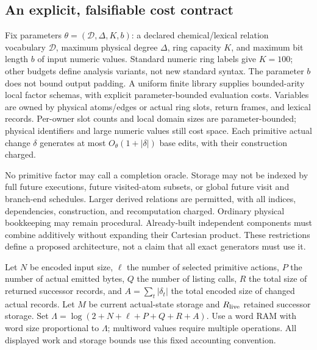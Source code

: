 \documentclass[11pt,a4paper]{article}
\begin{document}
\subsection{An explicit, falsifiable cost contract}
Fix parameters \(\theta=(\mathscr D,\Delta,K,b)\): a declared chemical/lexical
relation vocabulary \(\mathscr D\), maximum physical degree \(\Delta\), ring
capacity \(K\), and maximum bit length \(b\) of input numeric values. Standard
numeric ring labels give \(K=100\); other budgets define analysis variants, not
new standard syntax. The parameter \(b\) does not bound output padding. A uniform finite library supplies
bounded-arity local factor schemas, with explicit parameter-bounded evaluation
costs. Variables are owned by physical atoms/edges or actual ring slots, return
frames, and lexical records. Per-owner slot counts and local domain sizes are
parameter-bounded; physical identifiers and large numeric values still cost
space. Each primitive actual change \(\delta\) generates at most
\(O_\theta(1+|\delta|)\) base edits, with their construction charged.\cite{note127}

No primitive factor may call a completion oracle. Storage may not be indexed
by full future executions, future visited-atom subsets, or global future visit
and branch-end schedules. Larger derived relations are permitted, with all
indices, dependencies, construction, and recomputation charged. Ordinary
physical bookkeeping may remain procedural. Already-built independent components
must combine additively without expanding their Cartesian product. These
restrictions define a proposed architecture, not a claim that all exact
generators must use it.\cite{note126,note127}

Let \(N\) be encoded input size, \(\ell\) the number of selected primitive actions,
\(P\) the number of actual emitted bytes, \(Q\) the number of listing calls,
\(R\) the total size of returned successor records, and
\(A=\sum_t|\delta_t|\) the total encoded size of changed actual records.
Let \(M\) be current actual-state storage and \(R_{\rm live}\) retained successor
storage. Set \(\Lambda=\log(2+N+\ell+P+Q+R+A)\). Use a word RAM with word size
proportional to \(\Lambda\); multiword values require multiple operations.
All displayed work and storage bounds use this fixed accounting convention.
\end{document}
